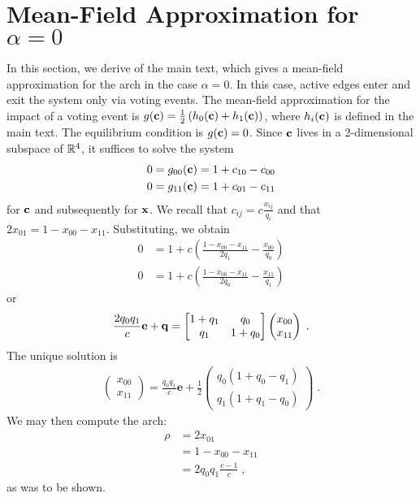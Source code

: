 \documentclass[final,supplement,onefignum,onetabnum]{siamart171218}
\begin{document}
\section{Mean-Field Approximation for $\alpha = 0$} \label{sec:SI_alpha_0}
  In this section, we derive  of the main text, which gives a mean-field approximation for the arch in the case $\alpha = 0$. 
  In this case, active edges enter and exit the system only via voting events. 
  The mean-field approximation for the impact of a voting event is $g(\mathbf{c}) = \frac{1}{2}\left(h_0(\mathbf{c}) + h_1(\mathbf{c})\right)$, where $h_i(\mathbf{c})$ is defined in the main text. 
  The equilibrium condition is $g(\mathbf{c}) = 0$. 
	Since $\mathbf{c}$ lives in a 2-dimensional subspace of $\mathbb{R}^4$, it suffices to solve the system
	\begin{align*}
		0 &= g_{00}(\mathbf{c}) = 1 + c_{10} - c_{00} \\ 
		0 &= g_{11}(\mathbf{c}) = 1 + c_{01} - c_{11} 
	\end{align*}
	for $\mathbf{c}$ and subsequently for $\mathbf{x}$.  
  We recall that $c_{ij} = c\frac{x_{ij}}{q_i}$ and that $2x_{01} = 1 - x_{00} - x_{11}$. 
  Substituting, we obtain 
  \begin{align*}
    0 &= 1 +c \left(\frac{1 - x_{00} - x_{11}}{2q_1}  - \frac{x_{00}}{q_0}\right) \\ 
    0 &= 1 +c \left(\frac{1 - x_{00} - x_{11}}{2q_0}  - \frac{x_{11}}{q_1}\right) 
  \end{align*}
  or 
  \begin{align*}
    \frac{2q_0q_1}{c}\mathbf{e} + \mathbf{q} = \left[\begin{matrix} 1 + q_1 & q_0 \\ q_1 & 1 + q_0 \end{matrix}\right]\left(\begin{matrix}x_{00} \\ x_{11}\end{matrix}\right)\;.
  \end{align*}
  The unique solution is 
  \begin{align*}
    \left(\begin{matrix}x_{00} \\ x_{11}\end{matrix}\right) = \frac{q_0 q_1}{c} \mathbf{e} + \frac{1}{2}\left(\begin{matrix} q_0(1 + q_0 - q_1) \\ q_1(1 + q_1 - q_0) \end{matrix}\right)\;.
  \end{align*}
  We may then compute the arch: 
  \begin{align*}
    \rho &= 2x_{01} \\ 
         &= 1 - x_{00} - x_{11} \\ 
         &= 2q_0 q_1 \frac{c-1}{c}\;,
  \end{align*}
  as was to be shown. 
	



	
	
	




% 
\end{document}
